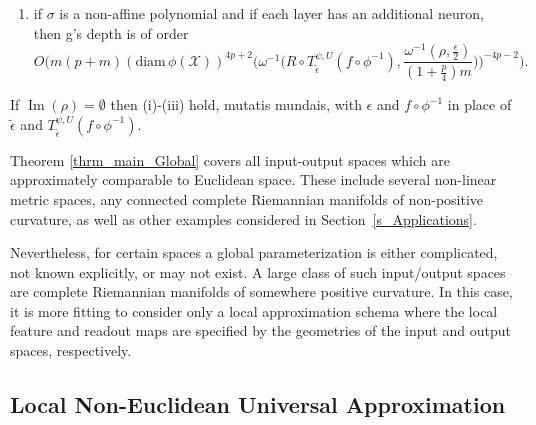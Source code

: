 \documentclass[anon,12pt]{colt2021} %
\begin{document}
\begin{theorem}
\begin{enumerate}[label=(i),leftmargin=1.75em]
    \item if $\sigma$ is a non-affine polynomial and if each layer has an additional neuron, then g's depth is of order
    \begin{equation*}
        O \bigg(m(p+m)(\text{diam} \, \phi(\mathcal{X}))^{4p+2}\bigg(\omega^{-1} \big(R \circ T_{\tilde \epsilon}^{\psi, U} (f \circ \phi^{-1}), \frac{\omega^{-1}(\rho, \frac{\epsilon}{2})}{(1+\frac{p}{4})m} \big) \bigg)^{-4p-2} \bigg).
    \end{equation*}
\end{enumerate}
If $\operatorname{Im}(\rho)=\emptyset$ then (i)-(iii) hold, mutatis mundais, with $\epsilon$ and $f\circ \phi^{-1}$ in place of $\tilde{\epsilon}$ and $T_{\tilde{\epsilon}}^{\psi,U}(f\circ \phi^{-1})$.
\end{theorem}

Theorem \ref{thrm_main_Global} covers all input-output spaces which are approximately comparable to Euclidean space.  These include several non-linear metric spaces, any connected complete Riemannian manifolds of non-positive curvature, as well as other examples considered in Section~\ref{s_Applications}.  

Nevertheless, for certain spaces a global parameterization is either complicated, not known explicitly, or may not exist.  A large class of such input/output spaces are complete Riemannian manifolds of somewhere positive curvature.  In this case, it is more fitting to consider only a local approximation schema where the local feature and readout maps are specified by the geometries of the input and output spaces, respectively.  

\subsection{Local Non-Euclidean Universal Approximation}\label{ss_Main_local}
\end{document}
